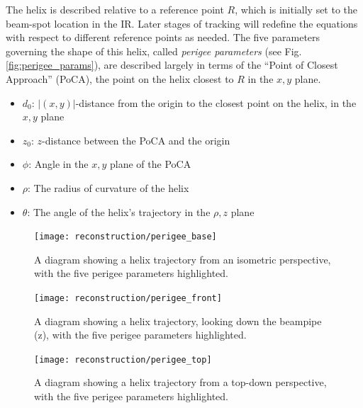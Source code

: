             The helix is described relative to a reference point $R$,
                which is initially set to the beam-spot location in the IR.
            Later stages of tracking will redefine the equations with respect to different reference points as needed.
            The five parameters governing the shape of this helix,
                called \textit{perigee parameters} (see Fig. \ref{fig:perigee_params}),
                are described largely in terms of the ``Point of Closest Approach'' (PoCA),
                the point on the helix closest to $R$ in the $x,y$ plane.
            \begin{itemize}
                \item $d_0$: $|(x,y)|$-distance from the origin to the closest point on the helix, in the $x,y$ plane
                \item $z_0$: $z$-distance between the PoCA and the origin
                \item $\phi$: Angle in the $x,y$ plane of the PoCA
                \item $\rho$: The radius of curvature of the helix
                \item $\theta$: The angle of the helix's trajectory in the $\rho,z$ plane
            \end{itemize}

            \begin{figure}[tbh]
                \texttt{[image: reconstruction/perigee\_base]}
                \caption{
                    A diagram showing a helix trajectory from an isometric perspective,
                        with the five perigee parameters highlighted.
                }
                \label{fig:perigee_params_base}
            \end{figure}

            \begin{figure}[tbh]
                \texttt{[image: reconstruction/perigee\_front]}
                \caption{
                    A diagram showing a helix trajectory, looking down the beampipe (z),
                        with the five perigee parameters highlighted.
                }
                \label{fig:perigee_params_front}
            \end{figure}

            \begin{figure}[tbh]
                \texttt{[image: reconstruction/perigee\_top]}
                \caption{
                    A diagram showing a helix trajectory from a top-down perspective,
                        with the five perigee parameters highlighted.
                }
                \label{fig:perigee_params_top}
            \end{figure}

